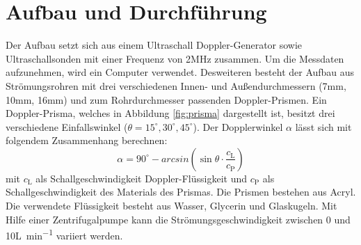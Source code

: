 \section {Aufbau und Durchführung}
\label{sec:durchführung}

Der Aufbau setzt sich aus einem Ultraschall Doppler-Generator sowie Ultraschallsonden mit einer Frequenz von 2\si{\mega\Hz} zusammen. Um die Messdaten aufzunehmen, wird ein Computer verwendet. Desweiteren besteht der Aufbau aus Strömungsrohren mit drei verschiedenen Innen- und Außendurchmessern (7\si{\milli\meter}, 10\si{\milli\meter}, 16\si{\milli\meter}) und zum Rohrdurchmesser passenden Doppler-Prismen. Ein Doppler-Prisma, welches in Abbildung \ref{fig:prisma} dargestellt ist, besitzt drei verschiedene Einfallswinkel ($\theta = 15^\circ, 30^\circ, 45^\circ$). Der Dopplerwinkel $\alpha$ lässt sich mit folgendem Zusammenhang berechnen:
\begin{equation}
   \alpha = 90^\circ -arcsin \left(\sin\theta\cdot\frac{c_\mathrm{L}}{c_\mathrm{P}}\right)
\end{equation}
mit $c_\mathrm{L}$ als Schallgeschwindigkeit Doppler-Flüssigkeit und $c_\mathrm{P}$ als Schallgeschwindigkeit des Materials des Prismas. Die Prismen bestehen aus Acryl.
Die verwendete Flüssigkeit besteht aus Wasser, Glycerin und Glaskugeln. Mit Hilfe einer Zentrifugalpumpe kann die Strömungsgeschwindigkeit zwischen 0 und 10\si{\liter\per\minute} variiert werden.

